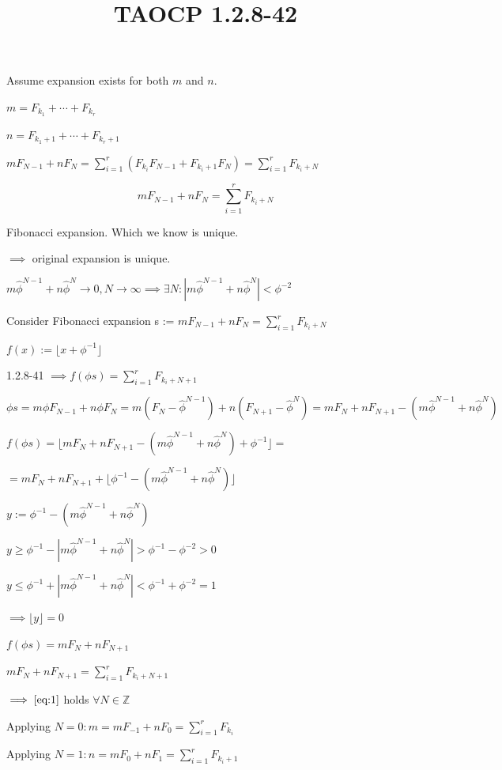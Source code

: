 \documentclass{article}
\title{TAOCP 1.2.8\mbox{-}42}
\begin{document}
\maketitle

Assume expansion exists for both \( m \) and \( n \).

\( m = F_{k_1} + \cdots + F_{k_r} \)

\( n = F_{k_1+1} + \cdots + F_{k_r+1} \)

\( mF_{N-1} + n F_N = \sum_{i=1}^{r} (F_{k_i}F_{N-1} + F_{k_i+1}F_N) = \sum_{i=1}^{r} F_{k_i+N} \)

\begin{equation}\label{eq:1}
mF_{N-1} + n F_N = \sum_{i=1}^{r} F_{k_i+N}
\end{equation}

Fibonacci expansion. Which we know is unique.

\( \implies \) original expansion is unique.

\( m\hat\phi^{N-1} + n\hat\phi^{N} \to 0, N \to \infty \implies \exists N: |m\hat\phi^{N-1} + n\hat\phi^{N}| < \phi^{-2} \)

Consider Fibonacci expansion s := \( mF_{N-1} + n F_N = \sum_{i=1}^{r} F_{k_i+N} \)

\( f(x) := \lfloor x + \phi^{-1}\rfloor \)

1.2.8-41 \( \implies f(\phi s) = \sum_{i=1}^{r} F_{k_i+N+1} \)

\( \phi s = m\phi F_{N-1} + n\phi F_N = m(F_{N} - \hat\phi^{N-1}) + n(F_{N+1} - \hat\phi^{N}) = mF_{N} + nF_{N+1} - (m\hat\phi^{N-1} + n\hat\phi^{N}) \)

\( f(\phi s) = \lfloor mF_{N} + nF_{N+1} - (m\hat\phi^{N-1} + n\hat\phi^{N}) + \phi^{-1} \rfloor = \)

\( = mF_{N} + nF_{N+1} + \lfloor \phi^{-1} - (m\hat\phi^{N-1} + n\hat\phi^{N}) \rfloor \)

\( y := \phi^{-1} - (m\hat\phi^{N-1} + n\hat\phi^{N}) \)

\( y \geq \phi^{-1} - |m\hat\phi^{N-1} + n\hat\phi^{N}| > \phi^{-1} - \phi^{-2} > 0 \)

\( y \leq \phi^{-1} + |m\hat\phi^{N-1} + n\hat\phi^{N}| < \phi^{-1} + \phi^{-2} = 1 \)

\( \implies \lfloor y \rfloor = 0 \)

\( f(\phi s) = mF_{N} + nF_{N+1} \)

\( mF_{N} + nF_{N+1} = \sum_{i=1}^{r} F_{k_i+N+1} \)

\( \implies \eqref{eq:1} \) holds \( \forall N \in \mathbb{Z} \)

Applying \( N = 0: m = mF_{-1} + nF_0 = \sum_{i=1}^{r} F_{k_i} \)

Applying \( N = 1: n = mF_{0} + nF_1 = \sum_{i=1}^{r} F_{k_i+1} \)
\end{document}
